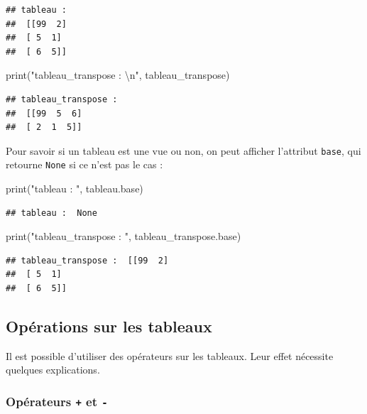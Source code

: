 \documentclass[
  12pt,
]{book}
\newenvironment{Shaded}{\begin{snugshade}}{\end{snugshade}}
\newcommand{\BuiltInTok}[1]{#1}
\newcommand{\CharTok}[1]{\textcolor[rgb]{0.31,0.60,0.02}{#1}}
\newcommand{\NormalTok}[1]{#1}
\newcommand{\StringTok}[1]{\textcolor[rgb]{0.31,0.60,0.02}{#1}}
\numberwithin{equation}{section}
\numberwithin{countremarque}{section}
\begin{document}
\begin{lstlisting}
## tableau : 
##  [[99  2]
##  [ 5  1]
##  [ 6  5]]
\end{lstlisting}

\begin{Shaded}
\begin{Highlighting}[]
\BuiltInTok{print}\NormalTok{(}\StringTok{"tableau\_transpose : }\CharTok{\textbackslash{}n}\StringTok{"}\NormalTok{, tableau\_transpose)}
\end{Highlighting}
\end{Shaded}

\begin{lstlisting}
## tableau_transpose : 
##  [[99  5  6]
##  [ 2  1  5]]
\end{lstlisting}

Pour savoir si un tableau est une vue ou non, on peut afficher l'attribut \texttt{base}, qui retourne \texttt{None} si ce n'est pas le cas :

\begin{Shaded}
\begin{Highlighting}[]
\BuiltInTok{print}\NormalTok{(}\StringTok{"tableau : "}\NormalTok{, tableau.base)}
\end{Highlighting}
\end{Shaded}

\begin{lstlisting}
## tableau :  None
\end{lstlisting}

\begin{Shaded}
\begin{Highlighting}[]
\BuiltInTok{print}\NormalTok{(}\StringTok{"tableau\_transpose : "}\NormalTok{, tableau\_transpose.base)}
\end{Highlighting}
\end{Shaded}

\begin{lstlisting}
## tableau_transpose :  [[99  2]
##  [ 5  1]
##  [ 6  5]]
\end{lstlisting}

\subsection{Opérations sur les tableaux}\label{operations-tableaux}

Il est possible d'utiliser des opérateurs sur les tableaux. Leur effet nécessite quelques explications.

\subsubsection{\texorpdfstring{Opérateurs \texttt{+} et \texttt{-}}{Opérateurs + et -}}\label{opuxe9rateurs-et--}
\end{document}
